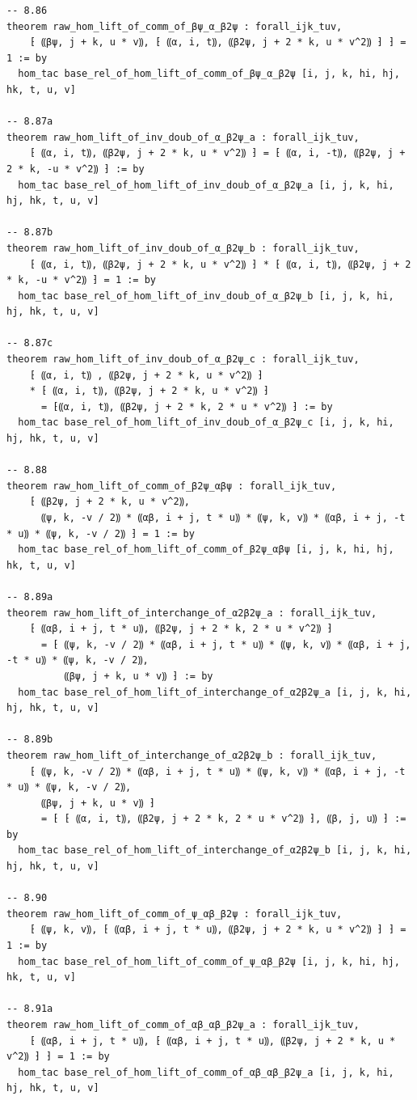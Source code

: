 \begin{Verbatim}
-- 8.86
theorem raw_hom_lift_of_comm_of_βψ_α_β2ψ : forall_ijk_tuv,
    ⁅ ⸨βψ, j + k, u * v⸩, ⁅ ⸨α, i, t⸩, ⸨β2ψ, j + 2 * k, u * v^2⸩ ⁆ ⁆ = 1 := by
  hom_tac base_rel_of_hom_lift_of_comm_of_βψ_α_β2ψ [i, j, k, hi, hj, hk, t, u, v]

-- 8.87a
theorem raw_hom_lift_of_inv_doub_of_α_β2ψ_a : forall_ijk_tuv,
    ⁅ ⸨α, i, t⸩, ⸨β2ψ, j + 2 * k, u * v^2⸩ ⁆ = ⁅ ⸨α, i, -t⸩, ⸨β2ψ, j + 2 * k, -u * v^2⸩ ⁆ := by
  hom_tac base_rel_of_hom_lift_of_inv_doub_of_α_β2ψ_a [i, j, k, hi, hj, hk, t, u, v]

-- 8.87b
theorem raw_hom_lift_of_inv_doub_of_α_β2ψ_b : forall_ijk_tuv,
    ⁅ ⸨α, i, t⸩, ⸨β2ψ, j + 2 * k, u * v^2⸩ ⁆ * ⁅ ⸨α, i, t⸩, ⸨β2ψ, j + 2 * k, -u * v^2⸩ ⁆ = 1 := by
  hom_tac base_rel_of_hom_lift_of_inv_doub_of_α_β2ψ_b [i, j, k, hi, hj, hk, t, u, v]

-- 8.87c
theorem raw_hom_lift_of_inv_doub_of_α_β2ψ_c : forall_ijk_tuv,
    ⁅ ⸨α, i, t⸩ , ⸨β2ψ, j + 2 * k, u * v^2⸩ ⁆
    * ⁅ ⸨α, i, t⸩, ⸨β2ψ, j + 2 * k, u * v^2⸩ ⁆
      = ⁅⸨α, i, t⸩, ⸨β2ψ, j + 2 * k, 2 * u * v^2⸩ ⁆ := by
  hom_tac base_rel_of_hom_lift_of_inv_doub_of_α_β2ψ_c [i, j, k, hi, hj, hk, t, u, v]

-- 8.88
theorem raw_hom_lift_of_comm_of_β2ψ_αβψ : forall_ijk_tuv,
    ⁅ ⸨β2ψ, j + 2 * k, u * v^2⸩,
      ⸨ψ, k, -v / 2⸩ * ⸨αβ, i + j, t * u⸩ * ⸨ψ, k, v⸩ * ⸨αβ, i + j, -t * u⸩ * ⸨ψ, k, -v / 2⸩ ⁆ = 1 := by
  hom_tac base_rel_of_hom_lift_of_comm_of_β2ψ_αβψ [i, j, k, hi, hj, hk, t, u, v]

-- 8.89a
theorem raw_hom_lift_of_interchange_of_α2β2ψ_a : forall_ijk_tuv,
    ⁅ ⸨αβ, i + j, t * u⸩, ⸨β2ψ, j + 2 * k, 2 * u * v^2⸩ ⁆
      = ⁅ ⸨ψ, k, -v / 2⸩ * ⸨αβ, i + j, t * u⸩ * ⸨ψ, k, v⸩ * ⸨αβ, i + j, -t * u⸩ * ⸨ψ, k, -v / 2⸩,
          ⸨βψ, j + k, u * v⸩ ⁆ := by
  hom_tac base_rel_of_hom_lift_of_interchange_of_α2β2ψ_a [i, j, k, hi, hj, hk, t, u, v]

-- 8.89b
theorem raw_hom_lift_of_interchange_of_α2β2ψ_b : forall_ijk_tuv,
    ⁅ ⸨ψ, k, -v / 2⸩ * ⸨αβ, i + j, t * u⸩ * ⸨ψ, k, v⸩ * ⸨αβ, i + j, -t * u⸩ * ⸨ψ, k, -v / 2⸩,
      ⸨βψ, j + k, u * v⸩ ⁆
      = ⁅ ⁅ ⸨α, i, t⸩, ⸨β2ψ, j + 2 * k, 2 * u * v^2⸩ ⁆, ⸨β, j, u⸩ ⁆ := by
  hom_tac base_rel_of_hom_lift_of_interchange_of_α2β2ψ_b [i, j, k, hi, hj, hk, t, u, v]

-- 8.90
theorem raw_hom_lift_of_comm_of_ψ_αβ_β2ψ : forall_ijk_tuv,
    ⁅ ⸨ψ, k, v⸩, ⁅ ⸨αβ, i + j, t * u⸩, ⸨β2ψ, j + 2 * k, u * v^2⸩ ⁆ ⁆ = 1 := by
  hom_tac base_rel_of_hom_lift_of_comm_of_ψ_αβ_β2ψ [i, j, k, hi, hj, hk, t, u, v]

-- 8.91a
theorem raw_hom_lift_of_comm_of_αβ_αβ_β2ψ_a : forall_ijk_tuv,
    ⁅ ⸨αβ, i + j, t * u⸩, ⁅ ⸨αβ, i + j, t * u⸩, ⸨β2ψ, j + 2 * k, u * v^2⸩ ⁆ ⁆ = 1 := by
  hom_tac base_rel_of_hom_lift_of_comm_of_αβ_αβ_β2ψ_a [i, j, k, hi, hj, hk, t, u, v]


\end{Verbatim}
